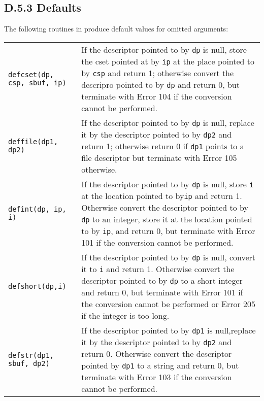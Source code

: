 \subsection[D.5.3 Defaults]{D.5.3 Defaults}

The following routines in  produce default values for
omitted arguments:

\begin{xtabular}{l@{\hspace{1cm}}p{11cm}}

\texttt{\color{red}defcset(dp, csp, sbuf, ip)} &
If the descriptor pointed to by \texttt{dp} is null, store the cset pointed at
by \texttt{ip} at the place pointed to by \texttt{csp} and return 1; otherwise
convert the descripro pointed to by \texttt{dp} and return 0, but terminate with
Error 104 if the conversion cannot be performed.\\

\texttt{\color{red}deffile(dp1, dp2)} &
If the descriptor pointed to by \texttt{dp} is null, replace it by the
descriptor pointed to by \texttt{dp2} and return 1; otherwise return 0 if
\texttt{dp1} points to a file descriptor but terminate with Error 105
otherwise.\\

\texttt{\color{red}defint(dp, ip, i)} &
If the descriptor pointed to by \texttt{dp} is null, store \texttt{i} at the
location pointed to by\texttt{ip} and return 1. Otherwise convert the descriptor
pointed to by \texttt{dp} to an integer, store it at the location pointed to by
\texttt{ip}, and return 0, but terminate with Error 101 if the conversion cannot
be performed.\\

\texttt{\color{red}defshort(dp,i)} &
If the descriptor pointed to by \texttt{dp} is null, convert it to \texttt{i}
and return 1. Otherwise convert the descriptor pointed to by \texttt{dp} to a
short integer and return 0, but terminate with Error 101 if the conversion cannot
be performed or Error 205 if the integer is too long.\\

\texttt{\color{red}defstr(dp1, sbuf, dp2)} &
If the descriptor pointed to by \texttt{dp1} is null,replace it by the
descriptor pointed to by \texttt{dp2} and return 0. Otherwise convert the
descriptor pointed by \texttt{dp1} to a string and return 0, but terminate with
Error 103 if the conversion cannot be performed.\\

\end{xtabular}



